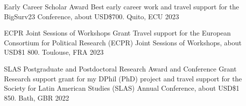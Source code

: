







\vspace{1mm}

\begin{cvhonors}
\cvhonor
{Early Career Scholar Award}
{Best early career work and travel support for the BigSurv23 Conference, about USD\$700.} %
{Quito, ECU}
{2023}
\end{cvhonors}

\vspace{1mm}

\begin{cvhonors}
\cvhonor
{ECPR Joint Sessions of Workshops Grant}
{Travel support for the European Consortium for Political Research (ECPR) Joint Sessions of Workshops, about USD\$1 800.} %
{Toulouse, FRA}
{2023}
\end{cvhonors}

\vspace{1mm}




\begin{cvhonors}
\cvhonor
{SLAS Postgraduate and Postdoctoral Research Award and Conference Grant} 
{Research support grant for my DPhil (PhD) project and travel support for the Society for Latin American Studies (SLAS) Annual Conference, about USD\$1 850.} %
{Bath, GBR}
{2022}
\end{cvhonors}

